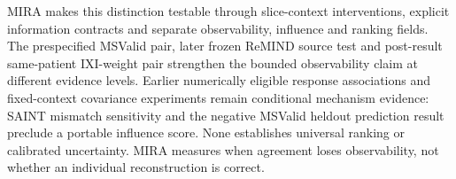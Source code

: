 \documentclass[10pt,twocolumn,letterpaper]{article}
\begin{document}
MIRA makes this distinction testable through slice-context interventions, explicit information contracts and separate observability, influence and ranking fields. The prespecified MSValid pair, later frozen ReMIND source test and post-result same-patient IXI-weight pair strengthen the bounded observability claim at different evidence levels. Earlier numerically eligible response associations and fixed-context covariance experiments remain conditional mechanism evidence: SAINT mismatch sensitivity and the negative MSValid heldout prediction result preclude a portable influence score. None establishes universal ranking or calibrated uncertainty. MIRA measures when agreement loses observability, not whether an individual reconstruction is correct.

{\small}
\end{document}
